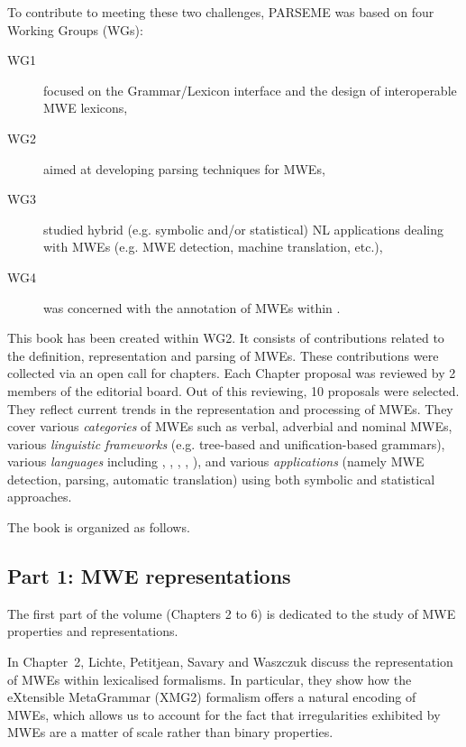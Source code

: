 \begin{refsection}
To contribute to meeting these two challenges, PARSEME was based on four
Working Groups (WGs):
\begin{description}
\item[WG1] focused on the Grammar/Lexicon interface and the design of
  interoperable MWE lexicons,
\item[WG2] aimed at developing parsing techniques for MWEs,
\item[WG3] studied hybrid (e.g. symbolic and/or statistical) NL
  applications dealing with MWEs (e.g. MWE detection, machine
  translation, etc.),
\item[WG4] was concerned with the annotation of MWEs within .
\end{description}

This book has been created within WG2. It consists of contributions
related to the definition, representation and parsing of MWEs. These
contributions were collected via an open call for chapters. Each
Chapter proposal was reviewed by 2 members of the editorial board. Out
of this reviewing, 10 proposals were selected. They reflect current
trends in the representation and processing of MWEs. They cover
various \emph{categories} of MWEs such as verbal, adverbial and
nominal MWEs, various \emph{linguistic frameworks} (e.g. tree-based
and unification-based grammars), various \emph{languages} including
, , , , ), and various
\emph{applications} (namely MWE detection, parsing, automatic
translation) using both symbolic and statistical approaches.


The book is organized as follows. 

\subsection*{Part 1: MWE representations}

The first part of the volume (Chapters 2 to 6) is dedicated to the
study of MWE properties and representations.

In Chapter~2, {Lichte, Petitjean, Savary and Waszczuk}
discuss the representation of MWEs within lexicalised formalisms. In
particular, they show how the eXtensible MetaGrammar (XMG2) formalism
offers a natural encoding of MWEs, which allows us to account for the
fact that irregularities exhibited by MWEs are a matter of scale
rather than binary properties.


\end{refsection}

